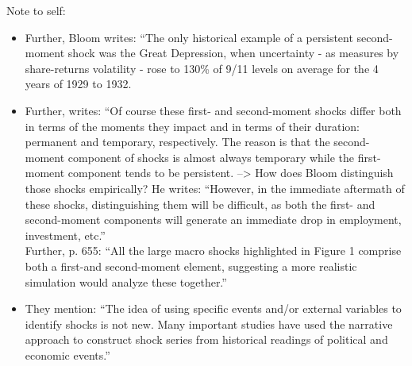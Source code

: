 \documentclass[a4paper,11pt,listof=nochaptergap,oneside,pointednumbers,bibtotoc,bigheadings,liststotoc]{scrbook}
\theoremstyle{mysatz}
\theoremstyle{mydefinition}
\theoremstyle{mybemerkung}
\begin{document}
\begingroup
    \fontsize{8pt}{12pt}\selectfont
    Note to self:
\begin{itemize}
	\item Further, Bloom writes: ``The only historical example of a persistent second-moment shock was the Great Depression, when uncertainty - as measures by share-returns volatility - rose to 130\% of 9/11 levels on average for the 4 years of 1929 to 1932. 
	\item Further, \citet[p. 657]{bloom:09} writes: ``Of course these first- and second-moment shocks differ both in terms of the moments they impact and in terms of their duration: permanent and temporary, respectively. The reason is that the second-moment component of shocks is almost always temporary while the first-moment component tends to be persistent. --> How does Bloom distinguish those shocks empirically? He writes: ``However, in the immediate aftermath of these shocks, distinguishing them will be difficult, as both the first- and second-moment components will generate an immediate drop in employment, investment, etc.'' \\
Further, p. 655: ``All the large macro shocks highlighted in Figure 1 comprise both a first-and second-moment element, suggesting a more realistic simulation would analyze these together.''
	\item They mention: ``The idea of using specific events and/or external variables to identify shocks is not new. Many important studies have used the narrative approach to construct shock series from historical readings of political and economic events.''
\end{itemize}
\endgroup

\end{document}

